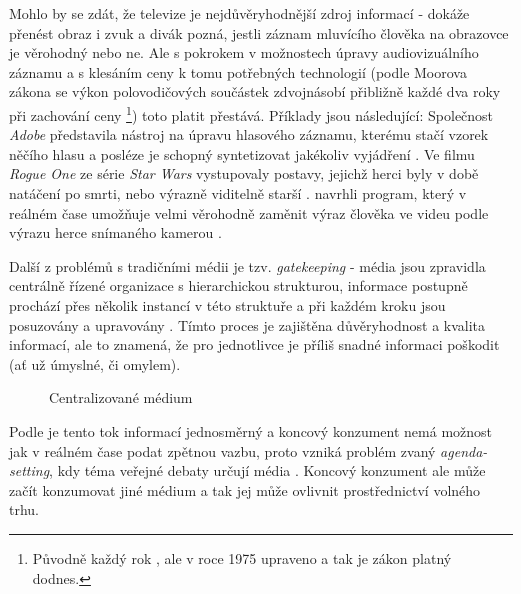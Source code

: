 \documentclass[a4papper]{article}
\begin{document}
Mohlo by se zdát, že televize je nejdůvěryhodnější zdroj informací - dokáže přenést obraz i zvuk a divák pozná, jestli záznam mluvícího člověka na obrazovce je věrohodný nebo ne. Ale s pokrokem v možnostech úpravy audiovizuálního záznamu a s klesáním ceny k tomu potřebných technologií (podle Moorova zákona se výkon polovodičových součástek zdvojnásobí přibližně každé dva roky při zachování ceny \citep{moore04}\footnote{Původně každý rok \citep{moore65}, ale v roce 1975 upraveno a tak je zákon platný dodnes.}) toto platit přestává. Příklady jsou následující: Společnost \textit{Adobe} představila nástroj na úpravu hlasového záznamu, kterému stačí vzorek něčího hlasu a posléze je schopný syntetizovat jakékoliv vyjádření \citep{anthony16}. Ve filmu \textit{Rogue One} ze série \textit{Star Wars} vystupovaly postavy, jejichž herci byly v době natáčení po smrti, nebo výrazně viditelně starší \citep{cooper17}. \citeauthor{thies16} navrhli program, který v reálném čase umožňuje velmi věrohodně zaměnit výraz člověka ve videu podle výrazu herce snímaného kamerou \citep{thies16}.

Další z problémů s tradičními médii je tzv. \textit{gatekeeping} - média jsou zpravidla centrálně řízené organizace s hierarchickou strukturou, informace postupně prochází přes několik instancí v této struktuře a při každém kroku jsou posuzovány a upravovány \citep{dragoni13}. Tímto proces je zajištěna důvěryhodnost a kvalita informací, ale to znamená, že pro jednotlivce je příliš snadné informaci poškodit (ať už úmyslné, či omylem).

\begin{figure}[!ht]
\centering
{}
\caption{Centralizované médium}
\end{figure}

Podle \citeauthor{dragoni13} je tento tok informací jednosměrný a koncový konzument nemá možnost jak v reálném čase podat zpětnou vazbu, proto vzniká problém zvaný \textit{agenda-setting}, kdy téma veřejné debaty určují média \citep{dragoni13}. Koncový konzument ale může začít konzumovat jiné médium a tak jej může ovlivnit prostřednictví volného trhu.
\end{document}
